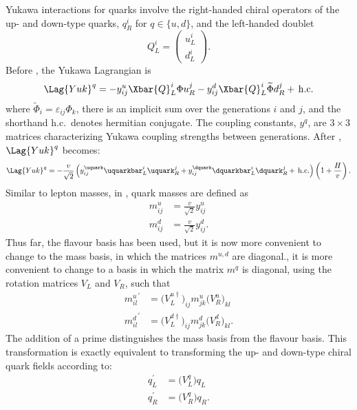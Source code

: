 Yukawa interactions for quarks involve the right-handed chiral operators of the up- and down-type
quarks, $q_R^i$ for $q\in\{u,d\}$, and the left-handed doublet
\begin{equation}
  Q_L^i = \begin{pmatrix}u^i_L\\d^i_L\end{pmatrix}.
\end{equation}
Before \SSB, the Yukawa Lagrangian is
\begin{equation}
  \Lag{Yuk}^q = - y_{ij}^u\Xbar{Q}_L^i\Phi u_R^j
  - y_{ij}^d\Xbar{Q}_L^i\widetilde\Phi d_R^j +\,\mathrm{h.c.}
  \label{eq:th:lagyukq}
\end{equation}
where $\widetilde\Phi_i = \varepsilon_{ij}\Phi_k$, there is an implicit sum over the generations
$i$ and $j$, and the shorthand h.c.~denotes hermitian conjugate.
The coupling constants, $y^{q}$, are $3\times3$ matrices characterizing Yukawa coupling strengths
between generations.
After \SSB, $\Lag{Yuk}^q$ becomes:
\begin{equation}
  \Lag{Yuk}^q =
  - \frac{v}{\sqrt{2}}
  \left(
  y_{ij}^\uquark\uquarkbar_L^i\uquark_R^j
  + y_{ij}^\dquark\dquarkbar_L^i\dquark_R^j
  +\,\mathrm{h.c.}
  \right)
  \left(1 + \frac{H}{v}\right).
  \label{eq:th:lagyuk2}
\end{equation}
Similar to lepton masses, in , quark masses are defined as
\begin{align}
  m_{ij}^u &= \frac{v}{\sqrt{2}}y_{ij}^u \nonumber\\
  m_{ij}^d &= \frac{v}{\sqrt{2}}y_{ij}^d.
\end{align}
Thus far, the flavour basis has been used, but it is now more convenient to change to the mass
basis, in which the matrices $m^{u,d}$ are diagonal., it is more convenient to change to a basis in which the matrix $m^q$
is diagonal, using the rotation matrices $V_L$ and $V_R$, such that
\begin{align}
  {m_{il}^{u}}^\prime &=  \big(V_L^{u\dagger}\big)_{ij} m_{jk}^u\big(V_R^u\big)_{kl} \nonumber\\
  {m_{il}^{d}}^\prime &=  \big(V_L^{d\dagger}\big)_{ij} m_{jk}^d\big(V_R^d\big)_{kl}.
\end{align}
The addition of a prime distinguishes the mass basis from the flavour basis.
This transformation is exactly equivalent to transforming the up- and
down-type chiral quark fields according to:
\begin{align}
  q_L^\prime &= \big(V_L^q\big)q_{L}^{} \nonumber\\
  q_R^\prime &= \big(V_R^q\big)q_{R}^{}.
\end{align}
